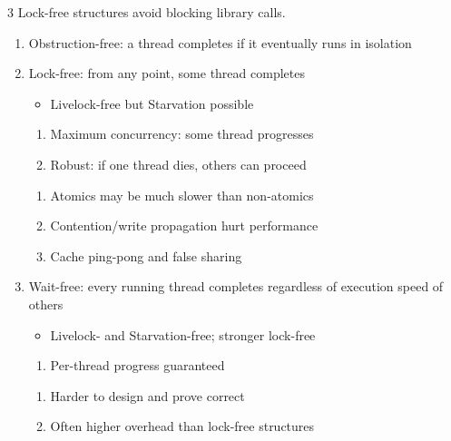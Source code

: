 \documentclass[12pt, a4paper]{article}
\begin{document}
\begin{multicols*}{3}
Lock-free structures avoid blocking library calls.
\begin{enumerate}[\roman*.]
  \item Obstruction-free: a thread completes if it eventually runs in isolation
  \item Lock-free: from any point, some thread completes
    \begin{itemize}[leftmargin=*]\vspace{3pt}
      \item Livelock-free but Starvation possible
    \end{itemize}
    \begin{enumerate}[leftmargin=*,label=$+$]\vspace{5pt}
      \item Maximum concurrency: some thread progresses
      \item Robust: if one thread dies, others can proceed
    \end{enumerate}
    \begin{enumerate}[leftmargin=*,label=$-$]\vspace{5pt}
      \item Atomics may be much slower than non-atomics
      \item Contention/write propagation hurt performance
      \item Cache ping-pong and false sharing
    \end{enumerate}
  \item Wait-free: every running thread completes regardless of execution speed of others
    \begin{itemize}[leftmargin=*]\vspace{3pt}
      \item Livelock- and Starvation-free; stronger lock-free
    \end{itemize}
    \begin{enumerate}[leftmargin=*,label=$+$]\vspace{5pt}
      \item Per-thread progress guaranteed
    \end{enumerate}
    \begin{enumerate}[leftmargin=*,label=$-$]\vspace{5pt}
      \item Harder to design and prove correct
      \item Often higher overhead than lock-free structures
    \end{enumerate}
\end{enumerate}


\end{multicols*}
\end{document}
